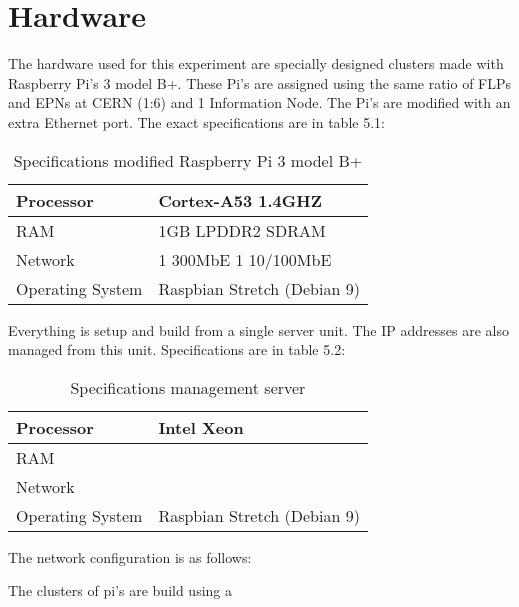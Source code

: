 \section{Hardware}
The hardware used for this experiment are specially designed clusters made with Raspberry Pi's 3 model B+. These Pi's are assigned using the same ratio of FLPs and EPNs at CERN (1:6) and 1 Information Node. The Pi's are modified with an extra Ethernet port. The exact specifications are in table 5.1:

\begin{table}[htb]
\begin{tabular}{| l | l |}
\hline
Processor & Cortex-A53 1.4GHZ\\ \hline
RAM & 1GB LPDDR2 SDRAM\\ \hline
Network & 1 300MbE 1 10/100MbE \\ \hline
Operating System & Raspbian Stretch (Debian 9)\\ \hline
\end{tabular} 
\caption{Specifications modified Raspberry Pi 3 model B+}
\end{table}

Everything is setup and build from a single server unit. The IP addresses are also managed from this unit. Specifications are in table 5.2:

\begin{table}[htb]
\begin{tabular}{| l | l |}
\hline
Processor & Intel Xeon\\ \hline
RAM & \\ \hline
Network & \\ \hline
Operating System & Raspbian Stretch (Debian 9)\\ \hline
\end{tabular}
\caption{Specifications management server}
\end{table}

The network configuration is as follows:

\newpage

The clusters of pi's are build using a 

